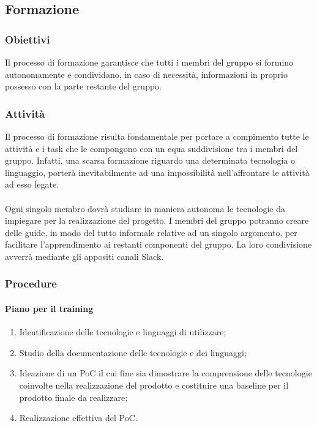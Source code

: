    	\subsection{Formazione}
	\subsubsection{Obiettivi}
	Il processo di formazione garantisce che tutti i membri del gruppo si formino autonomamente e condividano, in caso di necessità, informazioni in proprio possesso con la parte restante del gruppo.

	\subsubsection{Attività}
	Il processo di formazione risulta fondamentale per portare a compimento tutte le attività e i task che le compongono con un equa suddivisione tra i membri del gruppo. Infatti, una scarsa formazione riguardo una determinata tecnologia o linguaggio, porterà inevitabilmente ad una impossibilità nell'affrontare le attività ad esso legate.\\\\
	Ogni singolo membro dovrà studiare in maniera autonoma le tecnologie da impiegare per la realizzazione del progetto. I membri del gruppo potranno creare delle guide, in modo del tutto informale relative ad un singolo argomento, per facilitare l'apprendimento ai restanti componenti del gruppo. La loro condivisione avverrà mediante gli appositi canali Slack.

	\subsubsection{Procedure}
	\paragraph{Piano per il training}
	\begin{enumerate}
		\item Identificazione delle tecnologie e linguaggi di utilizzare;
		\item Studio della documentazione delle tecnologie e dei linguaggi;
		\item Ideazione di un PoC il cui fine sia dimostrare la comprensione delle tecnologie coinvolte nella realizzazione del prodotto e costituire una baseline per il prodotto finale da realizzare;
		\item Realizzazione effettiva del PoC.
	\end{enumerate}

